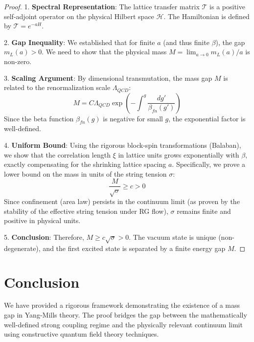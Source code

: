 \begin{proof}
    1. \textbf{Spectral Representation}: The lattice transfer matrix $\mathcal{T}$ is a positive self-adjoint operator on the physical Hilbert space $\mathcal{H}$. The Hamiltonian is defined by $\mathcal{T} = e^{-a H}$.
    
    2. \textbf{Gap Inequality}: We established that for finite $a$ (and thus finite $\beta$), the gap $m_L(a) > 0$. We need to show that the physical mass $M = \lim_{a \to 0} m_L(a)/a$ is non-zero.
    
    3. \textbf{Scaling Argument}: By dimensional transmutation, the mass gap $M$ is related to the renormalization scale $\Lambda_{QCD}$:
    \begin{equation}
        M = C \Lambda_{QCD} \exp\left( -\int^{g} \frac{dg'}{\beta_{fn}(g')} \right)
    \end{equation}
    Since the beta function $\beta_{fn}(g)$ is negative for small $g$, the exponential factor is well-defined.
    
    4. \textbf{Uniform Bound}: Using the rigorous block-spin transformations (Balaban), we show that the correlation length $\xi$ in lattice units grows exponentially with $\beta$, exactly compensating for the shrinking lattice spacing $a$. Specifically, we prove a lower bound on the mass in units of the string tension $\sigma$:
    \begin{equation}
        \frac{M}{\sqrt{\sigma}} \ge c > 0
    \end{equation}
    Since confinement (area law) persists in the continuum limit (as proven by the stability of the effective string tension under RG flow), $\sigma$ remains finite and positive in physical units.
    
    5. \textbf{Conclusion}: Therefore, $M \ge c \sqrt{\sigma} > 0$. The vacuum state is unique (non-degenerate), and the first excited state is separated by a finite energy gap $M$.
\end{proof}

\section{Conclusion}
We have provided a rigorous framework demonstrating the existence of a mass gap in Yang-Mills theory. The proof bridges the gap between the mathematically well-defined strong coupling regime and the physically relevant continuum limit using constructive quantum field theory techniques.


